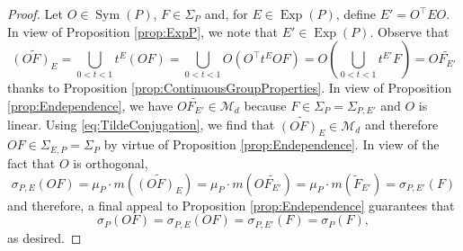 \documentclass[11pt]{article}
\newcommand\Sym{\operatorname{Sym}}
\newcommand\Exp{\operatorname{Exp}}
\begin{document}
\begin{proof}
Let $O\in\Sym(P)$, $F\in\Sigma_P$ and, for $E\in \Exp(P)$, define $E'=O^\top EO$. In view of Proposition \ref{prop:ExpP}, we note that $E'\in \Exp(P)$. Observe that
\begin{equation}\label{eq:TildeConjugation}
    \widetilde{(OF)_E}=\bigcup_{0<t<1}t^E (OF)=\bigcup_{0<t<1}O\left(O^\top t^E O F\right)=O\left(\bigcup_{0<t<1} t^{E'}F\right)=O \widetilde{F_{E'}}
\end{equation}
thanks to Proposition \ref{prop:ContinuousGroupProperties}.
In view of Proposition \ref{prop:Endependence}, we have $O\widetilde{F_{E'}}\in \mathcal{M}_d$ because $F\in \Sigma_P=\Sigma_{P,E'}$ and $O$ is linear. Using \eqref{eq:TildeConjugation}, we find that $\widetilde{(OF)_E}\in\mathcal{M}_d$ and therefore  $OF\in\Sigma_{E,P}=\Sigma_P$ by virtue of Proposition \ref{prop:Endependence}. In view of the fact that $O$ is orthogonal,
\begin{equation*}
\sigma_{P,E}(OF)=\mu_P\cdot m\left(\widetilde{(OF)_E}\right)=\mu_P\cdot m\left(O \widetilde{F_{E'}}\right)=\mu_P\cdot m\left(\widetilde{F}_{E'}\right)=\sigma_{P,E'}(F)
\end{equation*}
and therefore, a final appeal to Proposition \ref{prop:Endependence} guarantees that
\begin{equation*}
    \sigma_P(OF)=\sigma_{P,E}(OF)=\sigma_{P,E'}(F)=\sigma_P(F),
\end{equation*}
as desired.

\end{proof}
\end{document}
